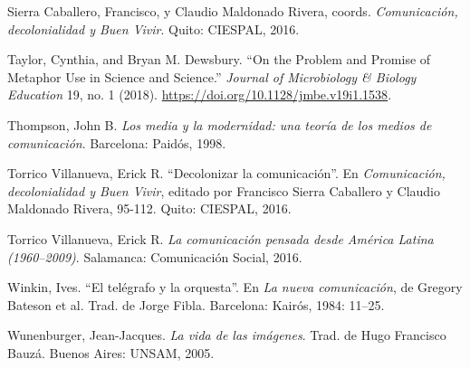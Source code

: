 \documentclass{tufte-handout}
\begin{document}
\begin{hangparas}{.25in}{1}
Sierra Caballero, Francisco, y Claudio Maldonado Rivera, coords.
\emph{Comunicación, decolonialidad y Buen Vivir}. Quito: CIESPAL, 2016.

Taylor, Cynthia, and Bryan M. Dewsbury. ``On the Problem and Promise of
Metaphor Use in Science and Science.'' \emph{Journal of Microbiology \&
Biology Education} 19, no. 1 (2018).
\url{https://doi.org/10.1128/jmbe.v19i1.1538}.

Thompson, John B. \emph{Los media y la modernidad: una teoría de los
medios de comunicación}. Barcelona: Paidós, 1998.

Torrico Villanueva, Erick R. ``Decolonizar la comunicación''. En
\emph{Comunicación, decolonialidad y Buen Vivir}, editado por Francisco
Sierra Caballero y Claudio Maldonado Rivera, 95-112. Quito: CIESPAL,
2016.

Torrico Villanueva, Erick R. \emph{La comunicación pensada desde América
Latina (1960--2009)}. Salamanca: Comunicación Social, 2016.

Winkin, Ives. ``El telégrafo y la orquesta''. En \emph{La nueva
comunicación}, de Gregory Bateson et al. Trad. de Jorge Fibla.
Barcelona: Kairós, 1984: 11--25.

Wunenburger, Jean-Jacques. \emph{La vida de las imágenes}. Trad. de Hugo
Francisco Bauzá. Buenos Aires: UNSAM, 2005.



\end{hangparas}
\end{document}
